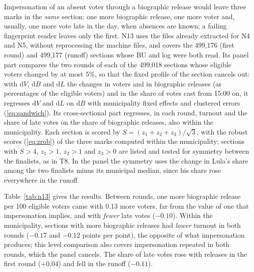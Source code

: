 Impersonation of an absent voter through a biographic release would leave
three marks in the \emph{same} section: one more biographic release, one more
voter and, usually, one more vote late in the day, when absences are known;
a failing fingerprint reader leaves only the first. N13 uses the files
already extracted for N4 and N5, without reprocessing the machine files, and
covers the 499,176 (first round) and 499,177 (runoff) sections whose BU and
log were both read. Its panel part compares the two rounds of each of the
499,018 sections whose eligible voters changed by at most 5\%, so that the
fixed profile of the section cancels out: with $\mathrm{d}V$, $\mathrm{d}B$
and $\mathrm{d}L$ the changes in voters and in biographic releases (as
percentages of the eligible voters) and in the share of votes cast from 15:00
on, it regresses $\mathrm{d}V$ and $\mathrm{d}L$ on $\mathrm{d}B$ with
municipality fixed effects and clustered errors (\ref{eq:sandwich}). Its cross-sectional part regresses,
in each round, turnout and the share of late votes on the share of
biographic releases, also within the municipality. Each section is scored by
$S=(z_{1}+z_{2}+z_{3})/\sqrt3$, with the robust scores (\ref{eq:zrob}) of
the three marks computed within the municipality; sections with $S>4$,
$z_1>1$, $z_2>1$ and $z_3>0$ are listed and tested for symmetry
between the finalists, as in T8. In the panel the symmetry uses the change
in Lula's share among the two finalists minus its municipal median, since
his share rose everywhere in the runoff.

Table~\ref{tab:n13} gives the results. Between rounds, one more biographic
release per 100 eligible voters came with 0.13 more voters, far from the
value of one that impersonation implies, and with \emph{fewer} late votes
($-0.10$). Within the municipality, sections with more biographic releases
had \emph{lower} turnout in both rounds ($-0.17$ and $-0.12$ points per
point), the opposite of what impersonation produces; this level comparison
also covers impersonation repeated in both rounds, which the panel cancels.
The share of late votes rose with releases in the first round ($+0.04$) and
fell in the runoff ($-0.11$).

